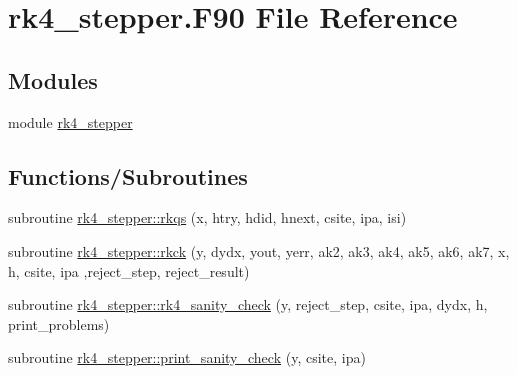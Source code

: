 \hypertarget{rk4__stepper_8_f90}{}\section{rk4\+\_\+stepper.\+F90 File Reference}
\label{rk4__stepper_8_f90}
\subsection*{Modules}
\begin{DoxyCompactItemize}
\item 
module \hyperlink{namespacerk4__stepper}{rk4\+\_\+stepper}
\end{DoxyCompactItemize}
\subsection*{Functions/\+Subroutines}
\begin{DoxyCompactItemize}
\item 
subroutine \hyperlink{namespacerk4__stepper_ab28f1256ce6f961126864e466f40ae22}{rk4\+\_\+stepper\+::rkqs} (x, htry, hdid, hnext, csite, ipa, isi)
\item 
subroutine \hyperlink{namespacerk4__stepper_a675958c59d7eeb060efc582670029a53}{rk4\+\_\+stepper\+::rkck} (y, dydx, yout, yerr, ak2, ak3, ak4, ak5, ak6, ak7, x, h, csite, ipa                                                                                                                                       ,reject\+\_\+step, reject\+\_\+result)
\item 
subroutine \hyperlink{namespacerk4__stepper_aabcab1b72aafe97081bad7f79084c79e}{rk4\+\_\+stepper\+::rk4\+\_\+sanity\+\_\+check} (y, reject\+\_\+step, csite, ipa, dydx, h, print\+\_\+problems)
\item 
subroutine \hyperlink{namespacerk4__stepper_a99e0aff479fdaaf90f598fd8bc4a7c33}{rk4\+\_\+stepper\+::print\+\_\+sanity\+\_\+check} (y, csite, ipa)
\end{DoxyCompactItemize}
